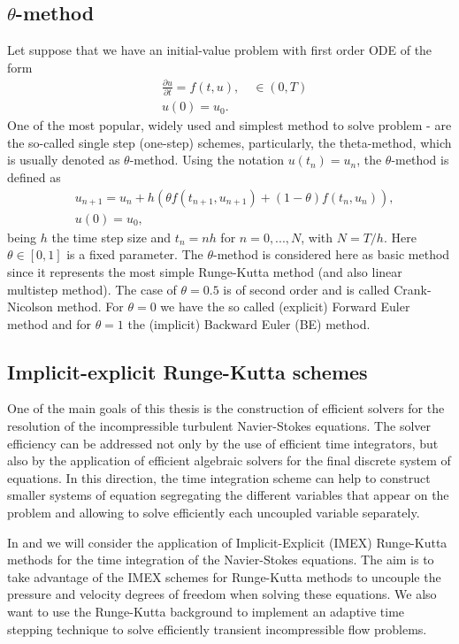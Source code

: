 \subsection{$ \theta $-method}
Let suppose that we have an initial-value problem with first order ODE of the form
\begin{align}
\label{eq-C2_time_ODE}
&\frac{\partial u}{\partial t}=f(t,u),\quad\in(0,T)\\
\label{eq-C2_time_ODE_0}
&u(0)=u_0.
\end{align}
One of the most popular, widely used and simplest method to solve problem - are the so-called single step (one-step) schemes, particularly, the theta-method, which is usually denoted as $ \theta $-method. Using the notation $u(t_n) = u_n$, the $ \theta $-method is defined as
\begin{align*}
\label{eq-C2_time_theta_method}
&u_{n+1} = u_n + h (\theta f(t_{n+1}, u_{n+1}) + (1-\theta )f(t_n,u_n)),\\
&u(0) = u_0,
\end{align*}
being $ h $ the time step size and $ t_n = nh $ for $ n=0,...,N $, with $ N=T/h $. Here $ \theta \in [0, 1] $ is a fixed parameter. The $ \theta $-method is considered here as basic method since it represents the most simple Runge-Kutta method (and also linear multistep method). The case of $ \theta=0.5 $ is of second order and is called Crank-Nicolson method. For $ \theta=0 $ we have the so called (explicit) Forward Euler method and for $ \theta=1 $ the (implicit) Backward Euler (BE) method.

\subsection{Implicit-explicit Runge-Kutta schemes}
One of the main goals of this thesis is the construction of efficient solvers for the resolution of the incompressible turbulent Navier-Stokes equations. The solver efficiency can be addressed not only by the use of efficient time integrators, but also by the application of efficient algebraic solvers for the final discrete system of equations. In this direction, the time integration scheme can help to construct smaller systems of equation segregating the different variables that appear on the problem and allowing to solve efficiently each uncoupled variable separately.

In  and  we will consider the application of Implicit-Explicit (IMEX) Runge-Kutta methods for the time integration of the Navier-Stokes equations. The aim is to take advantage of the IMEX schemes for Runge-Kutta methods to uncouple the pressure and velocity degrees of freedom when solving these equations. We also want to use the Runge-Kutta background to implement an adaptive time stepping technique to solve efficiently transient incompressible flow problems.

